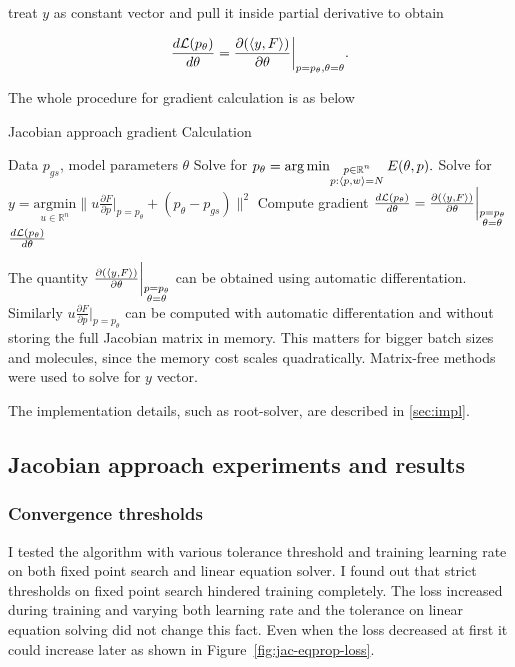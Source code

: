 \documentclass[a4paper,10pt]{report}
\begin{document}
treat $y$ as constant vector and pull it inside partial derivative to obtain

\begin{equation}
 \frac{d\mathcal{L}(p_\theta)}{d \theta} =   \frac{\partial (\langle y, F \rangle)}{\partial \theta}\bigg|_{p=p_\theta, \theta=\theta}.
\end{equation}



The whole procedure for gradient calculation is as below
\begin{algorithm}[H]
\caption{Jacobian approach gradient Calculation}
\begin{algorithmic}[1]
\Require Data $p_{gs}$, model parameters $\theta$
\State  Solve for $p_\theta  = \operatorname*{arg\,min}_{\substack{p \in \mathbb{R}^n \\ p: \langle p, w \rangle=N }} E(\theta, p).$
\State Solve for $y = \underset{u\in \mathbb{R}^n}{\mathrm{argmin}} \bigg\|u \frac{\partial F}{\partial p}\bigg|_{p=p_\theta} + (p_\theta-p_{gs})\bigg\|^2$
\State Compute gradient $\frac{d\mathcal{L}(p_\theta)}{d \theta} = \frac{\partial (\langle y, F \rangle)}{\partial \theta}\bigg|_{\substack{p=p_\theta \\\theta= \theta}}$
\State \Return $\frac{d\mathcal{L}(p_\theta)}{d \theta}$
\end{algorithmic}
\end{algorithm}


The quantity $\frac{\partial (\langle y, F \rangle)}{\partial \theta}\bigg|_{\substack{p=p_\theta \\\theta= \theta}}$ can be obtained using automatic differentation.  Similarly $u \frac{\partial F}{\partial p}\bigg|_{p=p_\theta}$ can be computed with automatic differentation and without storing the full Jacobian matrix in memory. This matters for bigger batch sizes and molecules, since the memory cost scales quadratically. Matrix-free methods were used to solve for $y$ vector.


The implementation details, such as root-solver, are described in \ref{sec:impl}.

\subsection{Jacobian approach experiments and results}

\subsubsection{Convergence thresholds}
 I tested the algorithm with various tolerance threshold and training learning rate on both fixed point search and linear equation solver.
I found out that strict thresholds on fixed point search hindered training completely. The loss increased during training and varying both learning rate and the tolerance on linear equation solving did not change this fact. Even when the loss decreased at first it could increase later as shown in Figure~\ref{fig:jac-eqprop-loss}.
\end{document}
